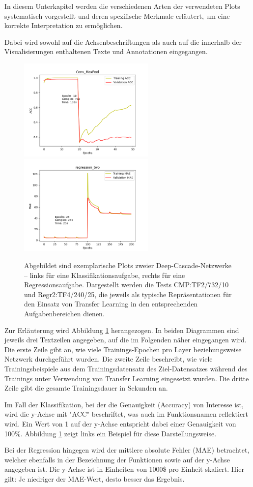 In diesem Unterkapitel werden die verschiedenen Arten der verwendeten Plots systematisch vorgestellt und deren spezifische Merkmale erläutert, 
um eine korrekte Interpretation zu ermöglichen.

Dabei wird sowohl auf die Achsenbeschriftungen als auch auf die innerhalb der Visualisierungen enthaltenen Texte und Annotationen eingegangen.

\begin{figure}[htpb]
    \includegraphics[height=5cm]{../../Plots/ba_plots/convmaxpool/2TFtr.png}
    \includegraphics[height=5cm]{../../Plots/ba_plots/regr2/regr2train.png}
    \caption{\label{fig:ploterkl} 
    \small{Abgebildet sind exemplarische Plots zweier Deep-Cascade-Netzwerke – links für eine Klassifikationsaufgabe, rechts für eine 
    Regressionsaufgabe.
    Dargestellt werden die Tests CMP:TF2/732/10 und Regr2:TF4/240/25, die jeweils als typische Repräsentationen für den Einsatz von Transfer 
    Learning in den entsprechenden Aufgabenbereichen dienen.}}
\end{figure}

Zur Erläuterung wird Abbildung \ref{fig:ploterkl} herangezogen. In beiden Diagrammen sind jeweils drei Textzeilen angegeben, auf die im 
Folgenden näher eingegangen wird. Die erste Zeile gibt an, wie viele Trainings-Epochen pro Layer beziehungsweise Netzwerk durchgeführt wurden. 
Die zweite Zeile beschreibt, wie viele Trainingsbeispiele aus dem Trainingsdatensatz des Ziel-Datensatzes während des Trainings unter 
Verwendung von Transfer Learning eingesetzt wurden. Die dritte Zeile gibt die gesamte Trainingsdauer in Sekunden an.

Im Fall der Klassifikation, bei der die Genauigkeit (Accuracy) von Interesse ist, wird die y-Achse mit "ACC" beschriftet, was auch im 
Funktionsnamen reflektiert wird. Ein Wert von 1 auf der y-Achse entspricht dabei einer Genauigkeit von 100\%. Abbildung 
\ref{fig:ploterkl} zeigt links ein Beispiel für diese Darstellungsweise.

Bei der Regression hingegen wird der mittlere absolute Fehler (MAE) betrachtet, welcher ebenfalls in der Bezeichnung der Funktionen sowie auf 
der y-Achse angegeben ist. Die y-Achse ist in Einheiten von 1000\$ pro Einheit skaliert. Hier gilt: Je niedriger der MAE-Wert, 
desto besser das Ergebnis.
